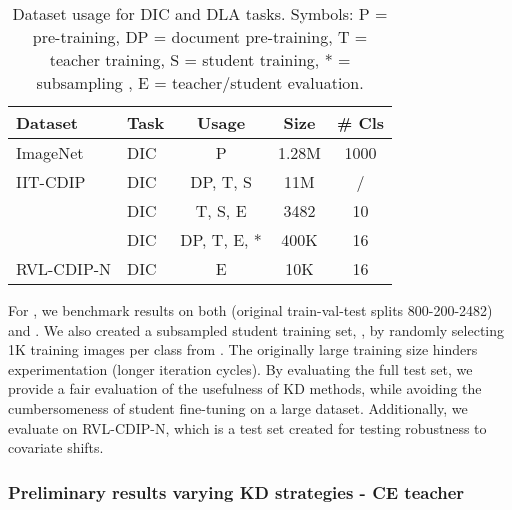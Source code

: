 \begin{table}[ht]
\centering
\caption{Dataset usage for DIC and DLA tasks. 
Symbols: P = pre-training, DP = document pre-training, T = teacher training, S = student training, * = subsampling , E = teacher/student evaluation.}
\begin{tabular}{|l|l|c|c|c|}
\hline
\textbf{Dataset} & \textbf{Task} & \textbf{Usage} & \textbf{Size} & \textbf{\# Cls} \\ \hline
ImageNet \cite{deng2009imagenet} & DIC & P & 1.28M & 1000 \\ \hline
IIT-CDIP \cite{lewis2006building} & DIC & DP, T, S & 11M & / \\ \hline
\tobacco{} \cite{kumar2013unsupervised} & DIC & T, S, E & 3482 & 10 \\ \hline
\rvl{} \cite{harley2015evaluation} & DIC & DP, T, E, * & 400K & 16 \\ \hline
RVL-CDIP-N \cite{larson2022evaluating} & DIC & E & 10K & 16 \\ \hline
\hline
\end{tabular}
\label{tab:DKD-datasets}
\end{table}

For \DC{}, we benchmark results on both \tobacco{} (original train-val-test splits 800-200-2482) and \rvl.  
We also created a subsampled student training set, \rvlone, by randomly selecting 1K training images per class from \rvl. The originally large training size hinders experimentation (longer iteration cycles).
By evaluating the full \rvl{} test set, we provide a fair evaluation of the usefulness of KD methods, while avoiding the cumbersomeness of student fine-tuning on a large dataset. Additionally, we evaluate on RVL-CDIP-N, which is a test set created for testing robustness to covariate shifts.




\subsubsection{Preliminary results varying KD strategies - CE teacher}

